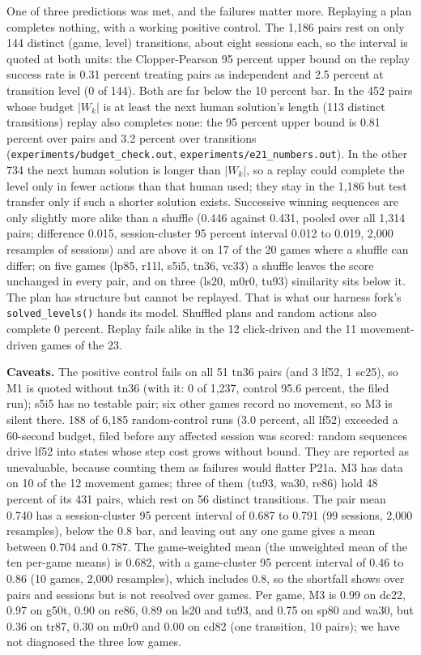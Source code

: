 \documentclass[
  11pt,
]{article}
\newcounter{none} %
\begin{document}
One of three predictions was met, and the failures matter more.
Replaying a plan completes nothing, with a working positive control. The
1,186 pairs rest on only 144 distinct (game, level) transitions, about
eight sessions each, so the interval is quoted at both units: the
Clopper-Pearson 95 percent upper bound on the replay success rate is
0.31 percent treating pairs as independent and 2.5 percent at transition
level (0 of 144). Both are far below the 10 percent bar. In the 452
pairs whose budget \(|W_k|\) is at least the next human solution's
length (113 distinct transitions) replay also completes none: the 95
percent upper bound is 0.81 percent over pairs and 3.2 percent over
transitions (\texttt{experiments/budget\_check.out},
\texttt{experiments/e21\_numbers.out}). In the other 734 the next human
solution is longer than \(|W_k|\), so a replay could complete the level
only in fewer actions than that human used; they stay in the 1,186 but
test transfer only if such a shorter solution exists. Successive winning
sequences are only slightly more alike than a shuffle (0.446 against
0.431, pooled over all 1,314 pairs; difference 0.015, session-cluster 95
percent interval 0.012 to 0.019, 2,000 resamples of sessions) and are
above it on 17 of the 20 games where a shuffle can differ; on five games
(lp85, r11l, s5i5, tn36, vc33) a shuffle leaves the score unchanged in
every pair, and on three (ls20, m0r0, tu93) similarity sits below it.
The plan has structure but cannot be replayed. That is what our harness
fork's \texttt{solved\_levels()} hands its model. Shuffled plans and
random actions also complete 0 percent. Replay fails alike in the 12
click-driven and the 11 movement-driven games of the 23.

\textbf{Caveats.} The positive control fails on all 51 tn36 pairs (and 3
lf52, 1 sc25), so M1 is quoted without tn36 (with it: 0 of 1,237,
control 95.6 percent, the filed run); s5i5 has no testable pair; six
other games record no movement, so M3 is silent there. 188 of 6,185
random-control runs (3.0 percent, all lf52) exceeded a 60-second budget,
filed before any affected session was scored: random sequences drive
lf52 into states whose step cost grows without bound. They are reported
as unevaluable, because counting them as failures would flatter P21a. M3
has data on 10 of the 12 movement games; three of them (tu93, wa30,
re86) hold 48 percent of its 431 pairs, which rest on 56 distinct
transitions. The pair mean 0.740 has a session-cluster 95 percent
interval of 0.687 to 0.791 (99 sessions, 2,000 resamples), below the 0.8
bar, and leaving out any one game gives a mean between 0.704 and 0.787.
The game-weighted mean (the unweighted mean of the ten per-game means)
is 0.682, with a game-cluster 95 percent interval of 0.46 to 0.86 (10
games, 2,000 resamples), which includes 0.8, so the shortfall shows over
pairs and sessions but is not resolved over games. Per game, M3 is 0.99
on dc22, 0.97 on g50t, 0.90 on re86, 0.89 on ls20 and tu93, and 0.75 on
sp80 and wa30, but 0.36 on tr87, 0.30 on m0r0 and 0.00 on cd82 (one
transition, 10 pairs); we have not diagnosed the three low games.
\end{document}
